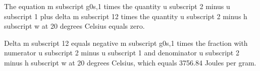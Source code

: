 The equation m subscript g0s,1 times the quantity u subscript 2 minus u subscript 1 plus delta m subscript 12 times the quantity u subscript 2 minus h subscript w at 20 degrees Celsius equals zero.

Delta m subscript 12 equals negative m subscript g0s,1 times the fraction with numerator u subscript 2 minus u subscript 1 and denominator u subscript 2 minus h subscript w at 20 degrees Celsius, which equals 3756.84 Joules per gram.